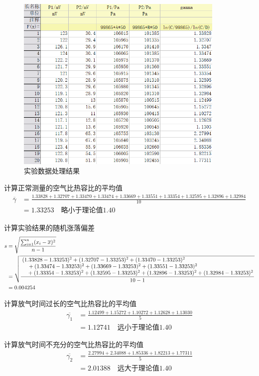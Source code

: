 \documentclass[11pt]{article}
\begin{document}
\begin{figure}[H]
    \centering
    \includegraphics[width=10cm]{Figs/数据.png}
    \caption{实验数据处理结果}
\end{figure}

计算正常测量的空气比热容比的平均值
\begin{align*}
    \overline{\gamma}&=\frac{1.33828+1.32707+1.33470+1.33474+1.33669+1.33551+1.33354+1.32595+1.32896+1.32984}{10}\\
    &=1.33253\quad\text{略小于理论值}1.40
\end{align*}

计算实验结果的随机涨落偏差
\begin{align*}
    s&=\sqrt{\frac{\sum_{i=1}^n(x_i-\overline{x})^2}{n-1}}\\
    &=\sqrt{\frac{\splitfrac{\splitfrac{(1.33828-1.33253)^2+(1.32707-1.33253)^2+(1.33470-1.33253)^2}{+(1.33474-1.33253)^2+(1.33669-1.33253)^2+(1.33551-1.33253)^2}}{+(1.33354-1.33253)^2+(1.32595-1.33253)^2+(1.32896-1.33253)^2+(1.32984-1.33253)^2}}{10-1}}\\
    &=0.004254
\end{align*}

计算放气时间过长的空气比热容比的平均值
\begin{align*}
    \overline{\gamma_1}&=\frac{1.12499+1.15272+1.10272+1.12628+1.13030}{5}\\
    &=1.12741\quad\text{远小于理论值}1.40
\end{align*}

计算放气时间不充分的空气比热容比的平均值
\begin{align*}
    \overline{\gamma_2}&=\frac{2.27994+2.34088+1.85336+1.82213+1.77311}{5}\\
    &=2.01388\quad\text{远大于理论值}1.40
\end{align*}
\end{document}
